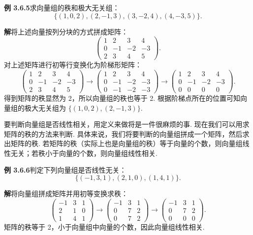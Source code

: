 \documentclass[UTF8, 12pt, fontset=fandol, oneside]{ctexart}
\begin{document}
\noindent\textbf{例 3.6.5}\quad 求向量组的秩和极大无关组：
\[
\{(1,0,2),(2,-1,3),(3,-2,4),(4,-3,5)\}.
\]

\noindent\textbf{解}\quad 将上述向量按列分块的方式拼成矩阵：
\[
\left(\begin{array}{rrrr}
1&2&3&4\\
0&-1&-2&-3\\
2&3&4&5
\end{array}\right).
\]
对上述矩阵进行初等行变换化为阶梯形矩阵：
\[
\left(\begin{array}{rrrr}
1&2&3&4\\
0&-1&-2&-3\\
2&3&4&5
\end{array}\right)
\to
\left(\begin{array}{rrrr}
1&2&3&4\\
0&-1&-2&-3\\
0&-1&-2&-3
\end{array}\right)
\to
\left(\begin{array}{rrrr}
1&2&3&4\\
0&-1&-2&-3\\
0&0&0&0
\end{array}\right).
\]
得到矩阵的秩显然为 2，所以向量组的秩也等于 2. 根据阶梯点所在的位置可知向量组的极大无关组为 $\{(1,0,2),(2,-1,3)\}$.

要判断向量组是否线性相关，用定义来做将是一件很麻烦的事. 现在我们可以用求矩阵的秩的方法来判断. 具体来说，我们将要判断的向量组拼成一个矩阵，然后求出矩阵的秩. 若矩阵的秩（实际上也是向量组的秩）等于向量的个数，则向量组线性无关；若秩小于向量的个数，则向量组线性相关.

\noindent\textbf{例 3.6.6}\quad 判定下列向量组是否线性无关：
\[
\{(-1,3,1),(2,1,0),(1,4,1)\}.
\]

\noindent\textbf{解}\quad 将向量组拼成矩阵并用初等变换求秩：
\[
\left(\begin{array}{rrr}
-1&3&1\\
2&1&0\\
1&4&1
\end{array}\right)
\to
\left(\begin{array}{rrr}
-1&3&1\\
0&7&2\\
0&7&2
\end{array}\right)
\to
\left(\begin{array}{rrr}
-1&3&1\\
0&7&2\\
0&0&0
\end{array}\right).
\]
矩阵的秩等于 2，小于向量组中向量的个数，因此向量组线性相关.
\end{document}
